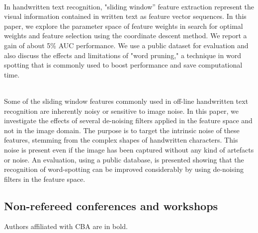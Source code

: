{{{\begin{enumerate}
\\ \aabstract
In handwritten text recognition, "sliding window'' feature extraction represent the visual information contained in written text as feature vector sequences. In this paper, we explore the parameter space of feature weights in search for optimal weights and feature selection using the coordinate descent method. We report a gain of about 5\% AUC performance. We use a public dataset for evaluation and also discuss the effects and limitations of "word pruning," a technique in word spotting that is commonly used to boost performance and save computational time.


\\ \aabstract 
Some of the sliding window features commonly used in off-line handwritten text recognition are inherently noisy or sensitive to image noise. In this paper, we investigate the effects of several de-noising filters applied in the feature space and not in the image domain. The purpose is to target the intrinsic noise of these features, stemming from the complex shapes of handwritten characters. This noise is present even if the image has been captured without any kind of artefacts or noise. An evaluation, using a public database, is presented showing that the recognition of word-spotting can be improved considerably by using de-noising filters in the feature space.





\end{enumerate}

\newpage
\subsection{Non-refereed conferences and workshops}\label{non-ref-conf}
Authors affiliated with CBA are in bold.
{\small 
\begin{enumerate}



\end{enumerate}}}}}
